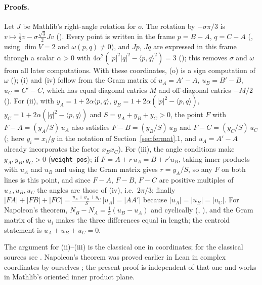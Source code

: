 \documentclass[11pt]{article}
\theoremstyle{definition}
\theoremstyle{remark}
\newcommand{\lean}[1]{\texttt{#1}}
\begin{document}
\paragraph{Proofs.} Let $J$ be Mathlib's right-angle rotation for $o$. The rotation by $-\sigma\pi/3$
is $v\mapsto\tfrac12v-\sigma\tfrac{\sqrt3}2Jv$ (). Every point
is written in the frame $p=B-A$, $q=C-A$ (, using $\dim V=2$ and
$\omega(p,q)\neq0$), and $Jp$, $Jq$ are expressed in this frame through a scalar $\alpha>0$ with
$4\alpha^2(|p|^2|q|^2-\langle p,q\rangle^2)=3$ (); this removes
$\sigma$ and $\omega$ from all later computations. With these coordinates, (o) is a sign computation
of $\omega$ (); (i) and (iv) follow from the Gram matrix of
$u_A=A'-A$, $u_B=B'-B$, $u_C=C'-C$, which has equal diagonal entries $M$ and off-diagonal entries
$-M/2$ (). For (ii), with
$y_A=1+2\alpha\langle p,q\rangle$, $y_B=1+2\alpha(|p|^2-\langle p,q\rangle)$,
$y_C=1+2\alpha(|q|^2-\langle p,q\rangle)$ and $S=y_A+y_B+y_C>0$, the point $F$ with
$F-A=(y_A/S)\,u_A$ also satisfies $F-B=(y_B/S)\,u_B$ and $F-C=(y_C/S)\,u_C$
(; here $y_i=x_i/g$ in the notation of Section~\ref{sec:fermat}.1, and $u_A=A'-A$ already incorporates the factor $x_Bx_C$). For (iii), the angle conditions make
$y_A,y_B,y_C>0$ (\lean{weight\_pos}); if $F=A+r\,u_A=B+r'u_B$, taking inner products with $u_A$ and $u_B$
and using the Gram matrix gives $r=y_A/S$, so any $F$ on both lines is this point, and since $F-A$, $F-B$, $F-C$ are positive multiples of
$u_A,u_B,u_C$ the angles are those of (iv), i.e.\ $2\pi/3$; finally
$|FA|+|FB|+|FC|=\frac{y_A+y_B+y_C}{S}\,|u_A|=|AA'|$ because $|u_A|=|u_B|=|u_C|$. For Napoleon's theorem,
$N_B-N_A=\tfrac13(u_B-u_A)$ and cyclically (,
), and the Gram matrix of the $u_i$ makes the three differences equal
in length; the centroid statement is $u_A+u_B+u_C=0$.

The argument for (ii)--(iii) is the classical one in coordinates; for the classical sources see
\cite{coxetergreitzer}. Napoleon's theorem was proved earlier in Lean in complex coordinates by
ourselves \cite{paperA}; the present proof is independent of that one and works in Mathlib's oriented
inner product plane.
\end{document}
